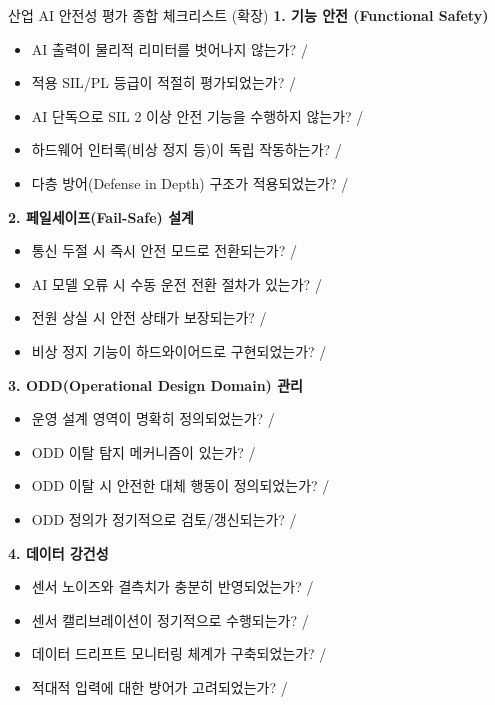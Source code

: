 \begin{practicaltool}{산업 AI 안전성 평가 종합 체크리스트 (확장)}
\textbf{1. 기능 안전 (Functional Safety)}
\begin{itemize}
    \item AI 출력이 물리적 리미터를 벗어나지 않는가? \checkmark / \texttimes
    \item 적용 SIL/PL 등급이 적절히 평가되었는가? \checkmark / \texttimes
    \item AI 단독으로 SIL 2 이상 안전 기능을 수행하지 않는가? \checkmark / \texttimes
    \item 하드웨어 인터록(비상 정지 등)이 독립 작동하는가? \checkmark / \texttimes
    \item 다층 방어(Defense in Depth) 구조가 적용되었는가? \checkmark / \texttimes
\end{itemize}

\textbf{2. 페일세이프(Fail-Safe) 설계}
\begin{itemize}
    \item 통신 두절 시 즉시 안전 모드로 전환되는가? \checkmark / \texttimes
    \item AI 모델 오류 시 수동 운전 전환 절차가 있는가? \checkmark / \texttimes
    \item 전원 상실 시 안전 상태가 보장되는가? \checkmark / \texttimes
    \item 비상 정지 기능이 하드와이어드로 구현되었는가? \checkmark / \texttimes
\end{itemize}

\textbf{3. ODD(Operational Design Domain) 관리}
\begin{itemize}
    \item 운영 설계 영역이 명확히 정의되었는가? \checkmark / \texttimes
    \item ODD 이탈 탐지 메커니즘이 있는가? \checkmark / \texttimes
    \item ODD 이탈 시 안전한 대체 행동이 정의되었는가? \checkmark / \texttimes
    \item ODD 정의가 정기적으로 검토/갱신되는가? \checkmark / \texttimes
\end{itemize}

\textbf{4. 데이터 강건성}
\begin{itemize}
    \item 센서 노이즈와 결측치가 충분히 반영되었는가? \checkmark / \texttimes
    \item 센서 캘리브레이션이 정기적으로 수행되는가? \checkmark / \texttimes
    \item 데이터 드리프트 모니터링 체계가 구축되었는가? \checkmark / \texttimes
    \item 적대적 입력에 대한 방어가 고려되었는가? \checkmark / \texttimes
\end{itemize}


\end{practicaltool}
